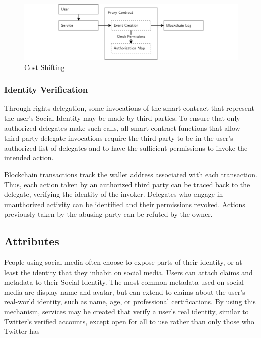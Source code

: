 \documentclass[12pt,letterpaper]{article}
\begin{document}
\begin{figure}
	\includegraphics[width=\linewidth]{figures/Cost Shifting.png}
	\caption{Cost Shifting}
	\label{fig:2}
\end{figure}

\subsubsection{Identity Verification}

Through rights delegation, some invocations of the smart contract that represent the
user's Social Identity may be made by third parties. To ensure that only authorized
delegates make such calls, all smart contract functions that allow third-party delegate
invocations require the third party to be in the user's authorized list of delegates and
to have the sufficient permissions to invoke the intended action.

Blockchain transactions track the wallet address associated with each transaction. Thus,
each action taken by an authorized third party can be traced back to the delegate,
verifying the identity of the invoker. Delegates who engage in unauthorized activity can
be identified and their permissions revoked. Actions previously taken by the abusing party
can be refuted by the owner.

\subsection{Attributes}\label{sec:attributes}

People using social media often choose to expose parts of their identity, or at least the
identity that they inhabit on social media. Users can attach claims and metadata to their
Social Identity. The most common metadata used on social media are display name and
avatar, but can extend to claims about the user's real-world identity, such as name, age,
or professional certifications. By using this mechanism, services may be created that
verify a user's real identity, similar to Twitter's verified accounts, except open for all
to use rather than only those who Twitter has \cite{twitter_verified_accounts}
\end{document}
